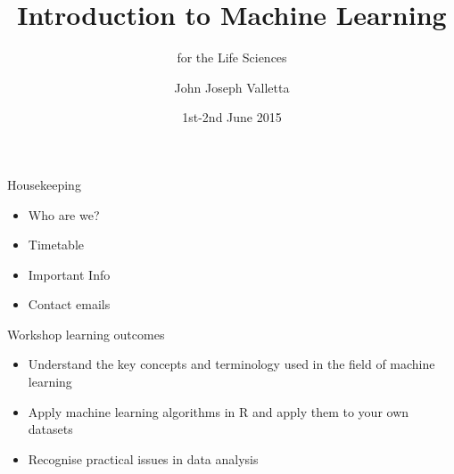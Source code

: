 \documentclass[pdf]{beamer}
\title{Introduction to Machine Learning}
\subtitle{for the Life Sciences}
\author{John Joseph Valletta}
\date[1st-2nd June 2015]{1st-2nd June 2015}
\institute[Penryn Campus]{University of Exeter, Penryn Campus, UK}
\begin{document}
\begin{frame}
\titlepage
\end{frame}
\begin{frame}{Housekeeping}
\begin{itemize}
	\item Who are we?
	\item Timetable
	\item Important Info
	\item Contact emails
\end{itemize}
\end{frame}
\begin{frame}{Workshop learning outcomes}
\begin{itemize}\addtolength{\itemsep}{0.5\baselineskip}
	\item Understand the key concepts and terminology used in the field of machine learning
	\item Apply machine learning algorithms in R and apply them to your own datasets
	\item Recognise practical issues in data analysis
\end{itemize}
\end{frame}
\end{document}
